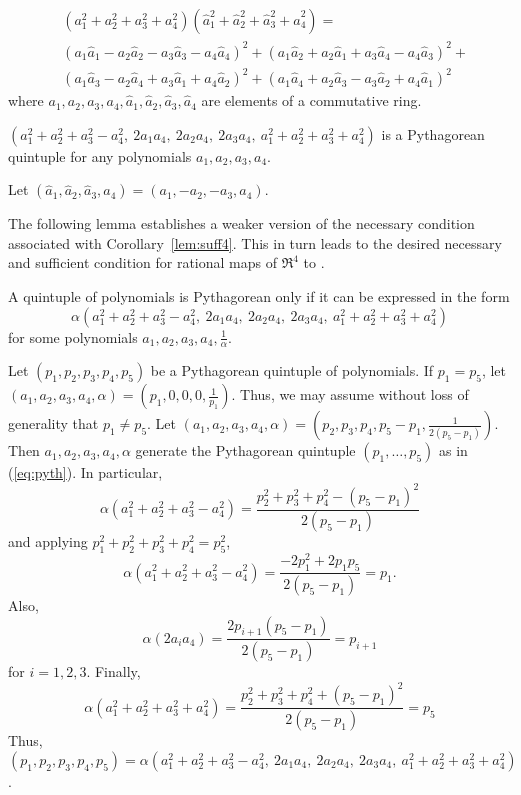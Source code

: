\begin{lemma}	
\[
\begin{array}{ll}
& (a_1^2 + a_2^2 + a_3^2 + a_4^2) 
(\hat{a}^2_1 + \hat{a}^2_2 + \hat{a}^2_3 + \hat{a}^2_4) = \\
& (a_1 \hat{a}_1 - a_2\hat{a}_2 - a_3\hat{a}_3 - a_4\hat{a}_4)^2 +
   (a_1\hat{a}_2 + a_2\hat{a}_1 + a_3\hat{a}_4 - a_4\hat{a}_3)^2 + \\
& (a_1\hat{a}_3 - a_2\hat{a}_4 + a_3\hat{a}_1 + a_4\hat{a}_2)^2 +
   (a_1\hat{a}_4 + a_2\hat{a}_3 - a_3\hat{a}_2 + a_4\hat{a}_1)^2
\end{array}
\]
where $a_1,a_2,a_3,a_4,\hat{a}_1,\hat{a}_2,\hat{a}_3,\hat{a}_4$ are elements of a
commutative ring.
\end{lemma}

\begin{corollary}
\label{lem:suff4}
$(a_1^2 + a_2^2 + a_3^2 - a_4^2,\ 2a_1a_4,\ 2a_2a_4,\ 2a_3a_4,\ 
 a_1^2 + a_2^2 + a_3^2 + a_4^2)$
is a Pythagorean quintuple for any polynomials $a_1,a_2,a_3,a_4$.
\end{corollary}
\prf
Let $(\hat{a}_1,\hat{a}_2,\hat{a}_3,\hat{a}_4) = (a_1,-a_2,-a_3,a_4)$. 
\QED

\noindent The following lemma establishes a weaker version of the necessary condition
associated with Corollary~\ref{lem:suff4}.
This in turn leads to the desired necessary and sufficient condition for rational maps
of $\Re^4$ to \Sn{3}.

\begin{lemma}
\label{thm:necessary4}
A quintuple of polynomials is Pythagorean only if it can be expressed in the form
\begin{equation}
\label{eq:pyth}
	\alpha (a_1^2 + a_2^2 + a_3^2 - a_4^2,
		\ 2a_1a_4,\ 2a_2a_4,\ 2a_3a_4,
		\ a_1^2 + a_2^2 + a_3^2 + a_4^2)
\end{equation}
for some polynomials $a_1,a_2,a_3,a_4,\frac{1}{\alpha}$.
\end{lemma}
\prf
Let $(p_1,p_2,p_3,p_4,p_5)$ be a Pythagorean quintuple of polynomials.
If $p_1 = p_5$, let\\
$(a_1,a_2,a_3,a_4,\alpha) = (p_1,0,0,0,\frac{1}{p_1})$.
Thus, we may assume without loss of generality that $p_1 \neq p_5$.
Let $(a_1,a_2,a_3,a_4,\alpha) = (p_2,p_3,p_4,p_5-p_1,\frac{1}{2(p_5 - p_1)})$.
Then $a_1,a_2,a_3,a_4,\alpha$ generate the Pythagorean quintuple
$(p_1,\ldots,p_5)$ as in (\ref{eq:pyth}).
In particular,
\[
\alpha (a_1^2 + a_2^2 + a_3^2 - a_4^2)
= \frac{p_2^2 + p_3^2 + p_4^2 - (p_5 - p_1)^2}{2(p_5-p_1)}
\]
and applying $p_1^2 + p_2^2 + p_3^2 + p_4^2 = p_5^2$,
\[
\alpha (a_1^2 + a_2^2 + a_3^2 - a_4^2) = \frac{-2p_1^2 + 2p_1p_5}{2(p_5 - p_1)} = p_1.
\]
Also, 
\[
\alpha (2a_i a_4) = \frac{2p_{i+1}(p_5 - p_1)}{2(p_5 - p_1)} = p_{i+1}
\]
for $i=1,2,3$.
Finally, 
\[
\alpha(a_1^2 + a_2^2 + a_3^2 + a_4^2) 
= \frac{p_2^2 + p_3^2 + p_4^2 + (p_5 - p_1)^2}{2(p_5-p_1)} = p_5
\]
Thus, $(p_1,p_2,p_3,p_4,p_5) = \alpha (a_1^2 + a_2^2 + a_3^2 - a_4^2,
		\ 2a_1a_4,\ 2a_2a_4,\ 2a_3a_4,
		\ a_1^2 + a_2^2 + a_3^2 + a_4^2)$.
\QED

